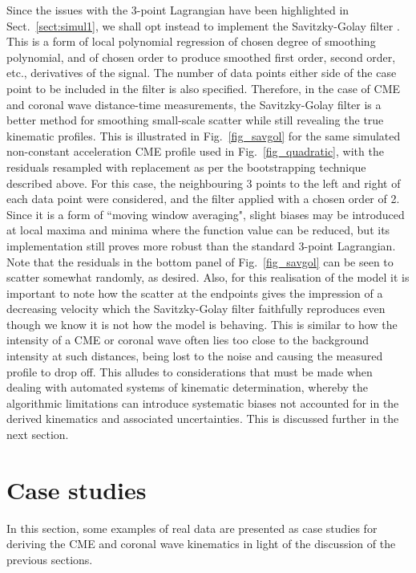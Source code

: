 \documentclass[structabstract]{aa}
\begin{document}
Since the issues with the 3-point Lagrangian have been highlighted in Sect.~\ref{sect:simul1}, we shall opt instead to implement the Savitzky-Golay filter \citep{Savitzky-Golay1964}. This is a form of local polynomial regression of chosen degree of smoothing polynomial, and of chosen order to produce smoothed first order, second order, etc., derivatives of the signal. The number of data points either side of the case point to be included in the filter is also specified. Therefore, in the case of CME and coronal wave distance-time measurements, the Savitzky-Golay filter is a better method for smoothing small-scale scatter while still revealing the true kinematic profiles. This is illustrated in Fig.~\ref{fig_savgol} for the same simulated non-constant acceleration CME profile used in Fig.~\ref{fig_quadratic}, with the residuals resampled with replacement as per the bootstrapping technique described above. For this case, the neighbouring 3 points to the left and right of each data point were considered, and the filter applied with a chosen order of 2. Since it is a form of ``moving window averaging", slight biases may be introduced at local maxima and minima where the function value can be reduced, but its implementation still proves more robust than the standard 3-point Lagrangian. Note that the residuals in the bottom panel of Fig.~\ref{fig_savgol} can be seen to scatter somewhat randomly, as desired. Also, for this realisation of the model it is important to note how the scatter at the endpoints gives the impression of a decreasing velocity which the Savitzky-Golay filter faithfully reproduces even though we know it is not how the model is behaving. This is similar to how the intensity of a CME or coronal wave often lies too close to the background intensity at such distances, being lost to the noise and causing the measured profile to drop off. This alludes to considerations that must be made when dealing with automated systems of kinematic determination, whereby the algorithmic limitations can introduce systematic biases not accounted for in the derived kinematics and associated uncertainties. This is discussed further in the next section.



\section{Case studies}
\label{sect:case_studies}

In this section, some examples of real data are presented as case studies for deriving the CME and coronal wave kinematics in light of the discussion of the previous sections. 
\end{document}

